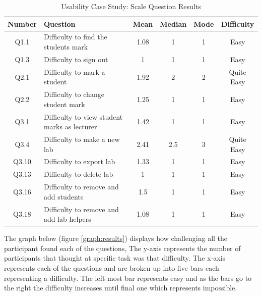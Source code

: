 \documentclass[12pt]{article}  %
\begin{document}
\begin{longtable}{@{\extracolsep{\fill}}|c|l|c|c|c|c|}
\caption{Usability Case Study: Scale Question Results} \label{table:usability} \\ \hline

\textbf{Number} & \textbf{Question} & \textbf{Mean} & \textbf{Median} & \textbf{Mode} & \textbf{Difficulty}\\ \hline

Q1.1 & Difficulty to find the students mark & 1.08 & 1 & 1 & Easy\\ \hline
Q1.3 & Difficulty to sign out & 1 & 1 & 1 & Easy \\ \hline

Q2.1 & Difficulty to mark a student & 1.92 & 2 & 2 & Quite Easy \\ \hline
Q2.2 & Difficulty to change student mark & 1.25 & 1 & 1 &  Easy \\ \hline

Q3.1 & Difficulty to view student marks as lecturer & 1.42 & 1 & 1 &  Easy \\ \hline
Q3.4 & Difficulty to make a new lab & 2.41 & 2.5 & 3 & Quite Easy \\ \hline
Q3.10 & Difficulty to export lab & 1.33 & 1 & 1 &  Easy \\ \hline
Q3.13 & Difficulty to delete lab & 1 & 1 & 1 &  Easy \\ \hline
Q3.16 & Difficulty to remove and add students & 1.5 & 1 & 1 &  Easy \\ \hline
Q3.18 & Difficulty to remove and add lab helpers & 1.08 & 1 & 1 & Easy \\ \hline

\end{longtable}

\noindent The graph below (figure \ref{graph:results}) displays how challenging all the participant found each of the questions, The y-axis represents the number of participants that thought at specific task was that difficulty. The x-axis represents each of the questions and are broken up into five bars each representing a difficulty. The left most bar represents easy and as the bars go to the right the difficulty increases until final one which represents impossible.  
\end{document}
